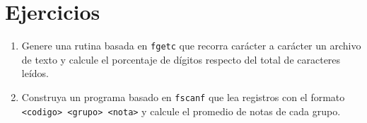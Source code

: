 \documentclass[12pt,a4paper]{article}
\begin{document}
\section{Ejercicios}
\begin{enumerate}
    \item Genere una rutina basada en \texttt{fgetc} que recorra carácter a carácter un archivo de texto y calcule el porcentaje de dígitos respecto del total de caracteres leídos.
    \item Construya un programa basado en \texttt{fscanf} que lea registros con el formato \texttt{<codigo> <grupo> <nota>} y calcule el promedio de notas de cada grupo.
\end{enumerate}
\end{document}
